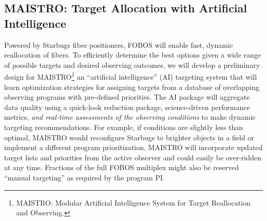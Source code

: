 \documentclass[oneside,11pt]{amsart}
\begin{document}

\subsection{MAISTRO: Target Allocation with Artificial Intelligence}
\label{sec:targeting}

Powered by Starbugs fiber positioners, FOBOS will enable fast, dynamic
reallocation of fibers.  To efficiently determine the best options given
a wide range of possible targets and desired observing outcomes, we will
develop a preliminary design for MAISTRO\footnote{MAISTRO: Modular
Artificial Intelligence System for Target Reallocation and Observing.}
an ``artificial intelligence'' (AI) targeting system that will learn
optimization strategies for assigning targets from a database of
overlapping observing programs with pre-defined priorities.  The AI
package will aggregate data quality using a quick-look reduction
package, science-driven performance metrics, {\it and real-time
assessments of the observing conditions} to make dynamic targeting
recommendations.  For example, if conditions are slightly less than
optimal, MAISTRO would reconfigure Starbugs to brighter objects in a
field or implement a different program prioritization.  MAISTRO will
incorporate updated target lists and priorities from the active observer
and could easily be over-ridden at any time.   Fractions of the full
FOBOS multiplex might also be reserved ``manual targeting'' as required
by the program PI.  


\end{document}
